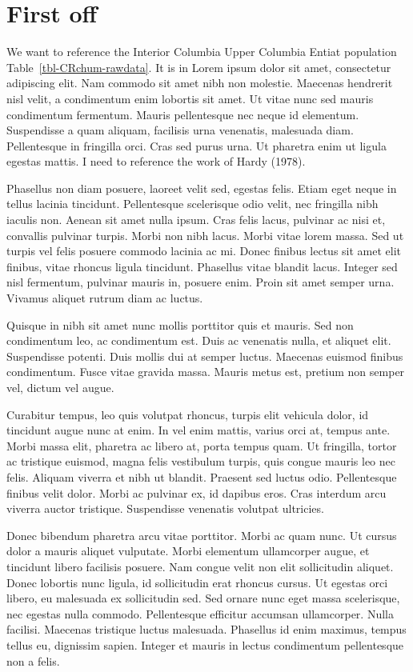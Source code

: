 \documentclass[
  letterpaper,
  oneside,
  open=any]{scrbook}
\begin{document}
\section{First off}\label{first-off}

We want to reference the Interior Columbia Upper Columbia Entiat
population Table~\ref{tbl-CRchum-rawdata}. It is in Lorem ipsum dolor
sit amet, consectetur adipiscing elit. Nam commodo sit amet nibh non
molestie. Maecenas hendrerit nisl velit, a condimentum enim lobortis sit
amet. Ut vitae nunc sed mauris condimentum fermentum. Mauris
pellentesque nec neque id elementum. Suspendisse a quam aliquam,
facilisis urna venenatis, malesuada diam. Pellentesque in fringilla
orci. Cras sed purus urna. Ut pharetra enim ut ligula egestas mattis. I
need to reference the work of Hardy (1978).

Phasellus non diam posuere, laoreet velit sed, egestas felis. Etiam eget
neque in tellus lacinia tincidunt. Pellentesque scelerisque odio velit,
nec fringilla nibh iaculis non. Aenean sit amet nulla ipsum. Cras felis
lacus, pulvinar ac nisi et, convallis pulvinar turpis. Morbi non nibh
lacus. Morbi vitae lorem massa. Sed ut turpis vel felis posuere commodo
lacinia ac mi. Donec finibus lectus sit amet elit finibus, vitae rhoncus
ligula tincidunt. Phasellus vitae blandit lacus. Integer sed nisl
fermentum, pulvinar mauris in, posuere enim. Proin sit amet semper urna.
Vivamus aliquet rutrum diam ac luctus.

Quisque in nibh sit amet nunc mollis porttitor quis et mauris. Sed non
condimentum leo, ac condimentum est. Duis ac venenatis nulla, et aliquet
elit. Suspendisse potenti. Duis mollis dui at semper luctus. Maecenas
euismod finibus condimentum. Fusce vitae gravida massa. Mauris metus
est, pretium non semper vel, dictum vel augue.

Curabitur tempus, leo quis volutpat rhoncus, turpis elit vehicula dolor,
id tincidunt augue nunc at enim. In vel enim mattis, varius orci at,
tempus ante. Morbi massa elit, pharetra ac libero at, porta tempus quam.
Ut fringilla, tortor ac tristique euismod, magna felis vestibulum
turpis, quis congue mauris leo nec felis. Aliquam viverra et nibh ut
blandit. Praesent sed luctus odio. Pellentesque finibus velit dolor.
Morbi ac pulvinar ex, id dapibus eros. Cras interdum arcu viverra auctor
tristique. Suspendisse venenatis volutpat ultricies.

Donec bibendum pharetra arcu vitae porttitor. Morbi ac quam nunc. Ut
cursus dolor a mauris aliquet vulputate. Morbi elementum ullamcorper
augue, et tincidunt libero facilisis posuere. Nam congue velit non elit
sollicitudin aliquet. Donec lobortis nunc ligula, id sollicitudin erat
rhoncus cursus. Ut egestas orci libero, eu malesuada ex sollicitudin
sed. Sed ornare nunc eget massa scelerisque, nec egestas nulla commodo.
Pellentesque efficitur accumsan ullamcorper. Nulla facilisi. Maecenas
tristique luctus malesuada. Phasellus id enim maximus, tempus tellus eu,
dignissim sapien. Integer et mauris in lectus condimentum pellentesque
non a felis.
\end{document}
